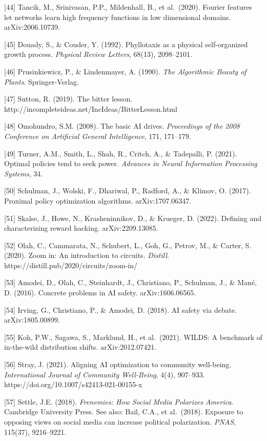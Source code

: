 \documentclass[12pt]{article}
\begin{document}
{[}44{]} Tancik, M., Srinivasan, P.P., Mildenhall, B., et al.~(2020).
Fourier features let networks learn high frequency functions in low
dimensional domains. arXiv:2006.10739.

{[}45{]} Douady, S., \& Couder, Y. (1992). Phyllotaxis as a physical
self-organized growth process. \emph{Physical Review Letters}, 68(13),
2098--2101.

{[}46{]} Prusinkiewicz, P., \& Lindenmayer, A. (1990). \emph{The
Algorithmic Beauty of Plants}. Springer-Verlag.

{[}47{]} Sutton, R. (2019). The bitter lesson.
http://incompleteideas.net/IncIdeas/BitterLesson.html

{[}48{]} Omohundro, S.M. (2008). The basic AI drives. \emph{Proceedings
of the 2008 Conference on Artificial General Intelligence}, 171,
171--179.

{[}49{]} Turner, A.M., Smith, L., Shah, R., Critch, A., \& Tadepalli, P.
(2021). Optimal policies tend to seek power. \emph{Advances in Neural
Information Processing Systems}, 34.

{[}50{]} Schulman, J., Wolski, F., Dhariwal, P., Radford, A., \& Klimov,
O. (2017). Proximal policy optimization algorithms. arXiv:1707.06347.

{[}51{]} Skalse, J., Howe, N., Krasheninnikov, D., \& Krueger, D.
(2022). Defining and characterizing reward hacking. arXiv:2209.13085.

{[}52{]} Olah, C., Cammarata, N., Schubert, L., Goh, G., Petrov, M., \&
Carter, S. (2020). Zoom in: An introduction to circuits. \emph{Distill}.
https://distill.pub/2020/circuits/zoom-in/

{[}53{]} Amodei, D., Olah, C., Steinhardt, J., Christiano, P., Schulman,
J., \& Mané, D. (2016). Concrete problems in AI safety.
arXiv:1606.06565.

{[}54{]} Irving, G., Christiano, P., \& Amodei, D. (2018). AI safety via
debate. arXiv:1805.00899.

{[}55{]} Koh, P.W., Sagawa, S., Marklund, H., et al.~(2021). WILDS: A
benchmark of in-the-wild distribution shifts. arXiv:2012.07421.

{[}56{]} Stray, J. (2021). Aligning AI optimization to community
well-being. \emph{International Journal of Community Well-Being}, 4(4),
907--933. https://doi.org/10.1007/s42413-021-00155-x

{[}57{]} Settle, J.E. (2018). \emph{Frenemies: How Social Media
Polarizes America}. Cambridge University Press. See also: Bail, C.A., et
al.~(2018). Exposure to opposing views on social media can increase
political polarization. \emph{PNAS}, 115(37), 9216--9221.
\end{document}
